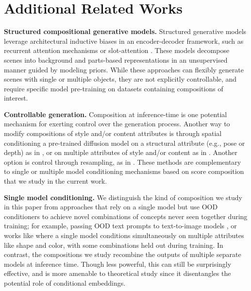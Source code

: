 \section{Additional Related Works}
\label{app:related}


\textbf{Structured compositional generative models.} Structured generative models leverage architectural inductive biases in an encoder-decoder framework, such as recurrent attention mechanisms \cite{gregor2015drawrecurrentneuralnetwork} or slot-attention \cite{Wang2023SlotVAEOS}. These models decompose scenes into background and parts-based representations in an unsupervised manner guided by modeling priors. While these approaches can flexibly generate scenes with single or multiple objects, they are not explicitly controllable, and require specific model pre-training on datasets containing compositions of interest.

\textbf{Controllable generation.} Composition at inference-time is one potential mechanism for exerting control over the generation process. Another way to modify compositions of style and/or content attributes is through spatial conditioning a pre-trained diffusion model on a structural attribute (e.g., pose or depth) as in  \citet{zhang2023adding}, or on multiple attributes of style and/or content as in \citet{conditional-loradapter}. Another option is control through resampling, as in \citet{liu2024correcting}. These methods are complementary to single or multiple model conditioning mechanisms based on score composition that we study in the current work.

\textbf{Single model conditioning.} We distinguish the kind of composition we study in this paper from approaches that rely on a single model but use OOD conditioners to achieve novel combinations of concepts never seen together during training; for example, passing OOD text prompts to text-to-image models \citep{nichol2021glide, podell2023sdxl}, or works like \citet{okawa2024compositional, park2024emergence} where a single model conditions simultaneously on multiple attributes like shape and color, with some combinations held out during training.
In contrast, the compositions we study recombine the outputs of multiple separate models at inference time.
Though less powerful, this can still be surprisingly effective, and is more amenable to theoretical study since it disentangles the potential role of conditional embeddings.

